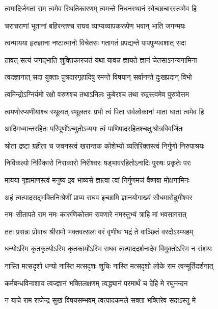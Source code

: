 \twolineshloka
{त्वमादिर्जगतां राम त्वमेव स्थितिकारणम्}
{त्वमन्ते निधनस्थानं स्वेच्छाचारस्त्वमेव हि} %

\twolineshloka
{चराचराणां भूतानां बहिरन्तश्च राघव}
{व्याप्यव्यापकरूपेण भवान् भाति जगन्मयः} %

\twolineshloka
{त्वन्मायया हृतज्ञाना नष्टात्मानो विचेतसः}
{गतागतं प्रपद्यन्ते पापपुण्यवशात् सदा} %

\twolineshloka
{तावत् सत्यं जगद्भाति शुक्तिकारजतं यथा}
{यावन्न ज्ञायते ज्ञानं चेतसाऽनन्यगामिना} %

\twolineshloka
{त्वदज्ञानात् सदा युक्ताः पुत्रदारगृहादिषु}
{रमन्ते विषयान् सर्वानन्ते दुःखप्रदान् विभो} %

\twolineshloka
{त्वमिन्द्रोऽग्निर्यमो रक्षो वरुणश्च तथाऽनिलः}
{कुबेरश्च तथा रुद्रस्त्वमेव पुरुषोत्तम} %

\twolineshloka
{त्वमणोरप्यणीयांश्च स्थूलात् स्थूलतरः प्रभो}
{त्वं पिता सर्वलोकानां माता धाता त्वमेव हि} %

\twolineshloka
{आदिमध्यान्तरहितः परिपूर्णोऽच्युतोऽव्ययः}
{त्वं पाणिपादरहितश्चक्षुःश्रोत्रविवर्जितः} %

\twolineshloka
{श्रोता द्रष्टा ग्रहीता च जवनस्त्वं खरान्तक}
{कोशेभ्यो व्यतिरिक्तस्त्वं निर्गुणो निरुपाश्रयः} %

\twolineshloka
{निर्विकल्पो निर्विकारो निराकारो निरीश्वरः}
{षड्भावरहितोऽनादिः पुरुषः प्रकृतेः परः} %

\twolineshloka
{मायया गृह्यमाणस्त्वं मनुष्य इव भाव्यसे}
{ज्ञात्वा त्वां निर्गुणमजं वैष्णवा मोक्षगामिनः} %

\twolineshloka
{अहं त्वत्पादसद्भक्तिनिःश्रेणीं प्राप्य राघव}
{इच्छामि ज्ञानयोगाख्यं सौधमारोढुमीश्वर} %

\twolineshloka
{नमः सीतापते राम नमः कारुणिकोत्तम}
{रावणारे नमस्तुभ्यं त्राहि मां भवसागरात्} %

\twolineshloka
{ततः प्रसन्नः प्रोवाच श्रीरामो भक्तवत्सलः}
{वरं वृणीष्व भद्रं ते वाञ्छितं वरदोऽस्म्यहम्} %


\twolineshloka
{धन्योऽस्मि कृतकृत्योऽस्मि कृतकार्योऽस्मि राघव}
{त्वत्पाददर्शनादेव विमुक्तोऽस्मि न संशयः} %

\twolineshloka
{नास्ति मत्सदृशो धन्यो नास्ति मत्सदृशः शुचिः}
{नास्ति मत्सदृशो लोके राम त्वन्मूर्तिदर्शनात्} %

\twolineshloka
{कर्मबन्धविनाशाय त्वज्ज्ञानं भक्तिलक्षणम्}
{त्वद्ध्यानं परमार्थं च देहि मे रघुनन्दन} %

\twolineshloka
{न याचे राम राजेन्द्र सुखं विषयसम्भवम्}
{त्वत्पादकमले सक्ता भक्तिरेव सदाऽस्तु मे} %

